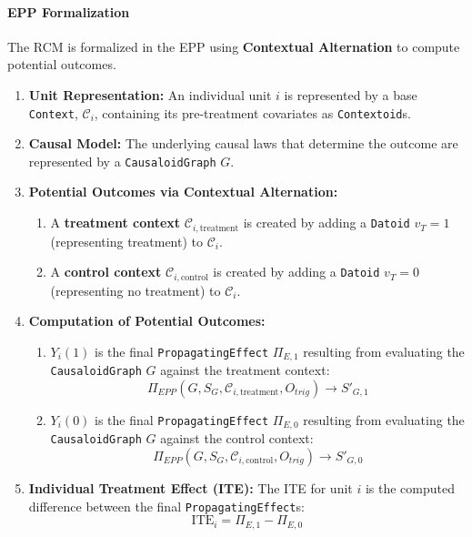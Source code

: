 \paragraph{EPP Formalization}
The RCM is formalized in the EPP using \textbf{Contextual Alternation} to compute potential outcomes.
\begin{enumerate}
    \item \textbf{Unit Representation:} An individual unit \(i\) is represented by a base \texttt{Context}, \(\mathcal{C}_i\), containing its pre-treatment covariates as \texttt{Contextoid}s.

    \item \textbf{Causal Model:} The underlying causal laws that determine the outcome are represented by a \texttt{CausaloidGraph} \(G\).

    \item \textbf{Potential Outcomes via Contextual Alternation:}
    \begin{enumerate}
        \item A \textbf{treatment context} \(\mathcal{C}_{i,\text{treatment}}\)
 is created by adding a \texttt{Datoid} \(v_T=1\) (representing treatment) to \(\mathcal{C}_i\).
        \item A \textbf{control context} \(\mathcal{C}_{i,\text{control}}\)
 is created by adding a \texttt{Datoid} \(v_T=0\) (representing no treatment) to \(\mathcal{C}_i\).
    \end{enumerate}

    \item \textbf{Computation of Potential Outcomes:}
    \begin{enumerate}
        \item \(Y_i(1)\) is the final \texttt{PropagatingEffect} \(\Pi_{E,1}\) resulting from evaluating the \texttt{CausaloidGraph} \(G\) against the treatment context:
        \[ \Pi_{EPP}(G, S_G, \mathcal{C}_{i,\text{treatment}}, O_{trig}) \to S'_{G,1} \]
        \item \(Y_i(0)\) is the final \texttt{PropagatingEffect} \(\Pi_{E,0}\) resulting from evaluating the \texttt{CausaloidGraph} \(G\) against the control context:
        \[ \Pi_{EPP}(G, S_G, \mathcal{C}_{i,\text{control}}, O_{trig}) \to S'_{G,0} \]
    \end{enumerate}

    \item \textbf{Individual Treatment Effect (ITE):} The ITE for unit \(i\) is the computed difference between the final \texttt{PropagatingEffect}s:
    \[ \text{ITE}_i = \Pi_{E,1} - \Pi_{E,0} \]
\end{enumerate}

